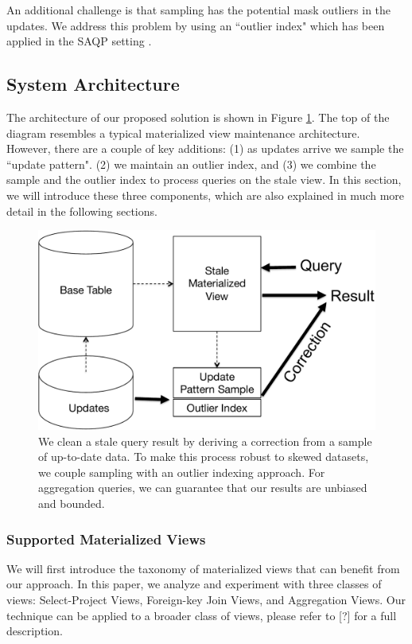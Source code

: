 An additional challenge is that sampling has the potential mask outliers in the updates.
We address this problem by using an ``outlier index" which has been applied in the SAQP setting \cite{chaudhuri2001overcoming}. 

\subsection{System Architecture}
The architecture of our proposed solution is shown in Figure \ref{sys-arch}.
The top of the diagram resembles a typical materialized view maintenance architecture.
However, there are a couple of key additions: (1) as updates arrive we sample the ``update pattern". 
(2) we maintain an outlier index, and (3) we combine the sample and the outlier index to process queries on the stale view.
In this section, we will introduce these three components, which are also explained in much more detail in the following sections.

\begin{figure}[h]
\label{sys-arch}
\centering
 \includegraphics[scale=0.35]{figs/sys-arch.pdf}
 \caption{We clean a stale query result by deriving a correction from a sample of up-to-date data. To make this process robust to skewed datasets, we couple sampling with an outlier indexing approach. For aggregation queries, we can guarantee that our results are unbiased and bounded.}
\end{figure}

\subsubsection{Supported Materialized Views}\label{subsubsec:supported-view}
We will first introduce the taxonomy of materialized views that can benefit from our approach. 
In this paper, we analyze and experiment with three classes of views: Select-Project Views, Foreign-key Join Views, and Aggregation Views.
Our technique can be applied to a broader class of views, please refer to [?] for a full description.
\vspace{1em}

